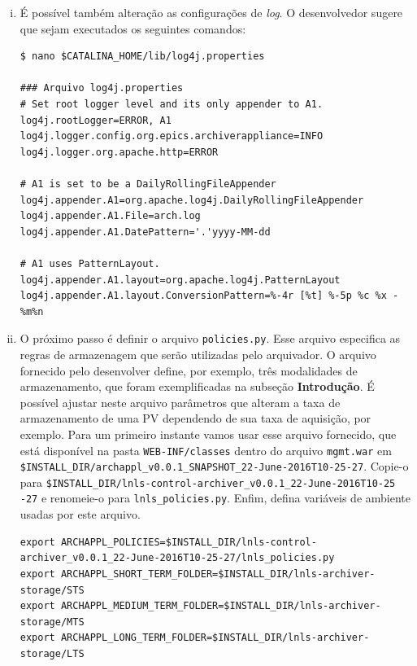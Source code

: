 \begin {enumerate}[i.]
Serão criadas 4 pastas dentro de
, uma
para cada módulo.

\item É possível também alteração as configurações de \textit{log}. O
desenvolvedor sugere que sejam executados os seguintes comandos:

\begin{lstlisting}[keywordstyle=\ttfamily, style=nonumbers]
$ nano $CATALINA_HOME/lib/log4j.properties

### Arquivo log4j.properties
# Set root logger level and its only appender to A1.
log4j.rootLogger=ERROR, A1
log4j.logger.config.org.epics.archiverappliance=INFO
log4j.logger.org.apache.http=ERROR

# A1 is set to be a DailyRollingFileAppender
log4j.appender.A1=org.apache.log4j.DailyRollingFileAppender
log4j.appender.A1.File=arch.log
log4j.appender.A1.DatePattern='.'yyyy-MM-dd

# A1 uses PatternLayout.
log4j.appender.A1.layout=org.apache.log4j.PatternLayout
log4j.appender.A1.layout.ConversionPattern=%-4r [%t] %-5p %c %x - %m%n
\end{lstlisting}

\item O próximo passo é definir o arquivo \texttt{policies.py}. Esse arquivo
especifica as regras de armazenagem que serão utilizadas pelo arquivador. O
arquivo fornecido pelo desenvolver define, por exemplo, três modalidades de
armazenamento, que foram exemplificadas na subseção \textbf{Introdução}. É
possível ajustar neste arquivo parâmetros que alteram a taxa de armazenamento de
uma PV dependendo de sua taxa de aquisição, por exemplo. Para um primeiro
instante vamos usar esse arquivo fornecido, que está disponível na pasta
\texttt{WEB-INF/classes} dentro do arquivo \texttt{mgmt.war} em
\texttt{\$INSTALL\_DIR/archappl\_v0.0.1\_SNAPSHOT\_22-June-2016T10-25-27}.
Copie-o para
\texttt{\$INSTALL\_DIR/lnls-control-archiver\_v0.0.1\_22-June-2016T10-25 -27} e
renomeie-o para \texttt{lnls\_policies.py}. Enfim, defina variáveis de ambiente
usadas por este arquivo.

\begin{lstlisting}[keywordstyle=\ttfamily, style=nonumbers]
export ARCHAPPL_POLICIES=$INSTALL_DIR/lnls-control-archiver_v0.0.1_22-June-2016T10-25-27/lnls_policies.py
export ARCHAPPL_SHORT_TERM_FOLDER=$INSTALL_DIR/lnls-archiver-storage/STS
export ARCHAPPL_MEDIUM_TERM_FOLDER=$INSTALL_DIR/lnls-archiver-storage/MTS
export ARCHAPPL_LONG_TERM_FOLDER=$INSTALL_DIR/lnls-archiver-storage/LTS
\end{lstlisting}


\end{enumerate}
